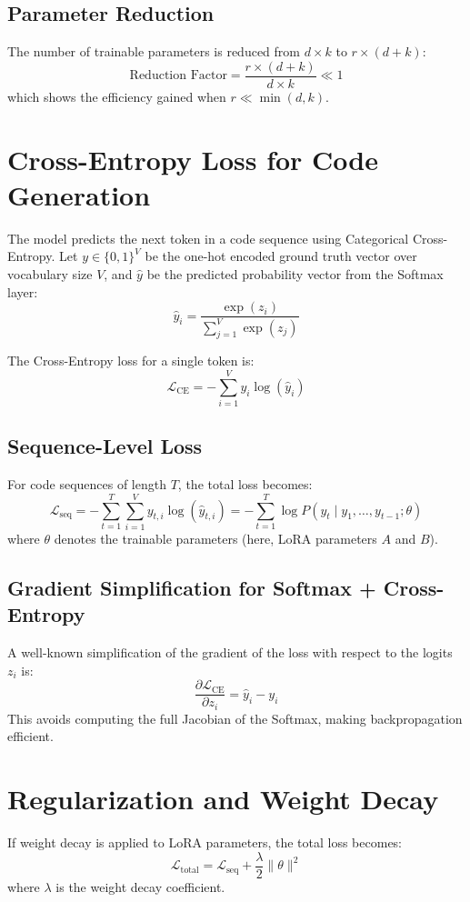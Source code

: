 \subsection{Parameter Reduction}
The number of trainable parameters is reduced from $d \times k$ to $r \times (d + k)$:
\[
\text{Reduction Factor} = \frac{r \times (d+k)}{d \times k} \ll 1
\]
which shows the efficiency gained when $r \ll \min(d,k)$.

\section{Cross-Entropy Loss for Code Generation}
The model predicts the next token in a code sequence using Categorical Cross-Entropy. Let $y \in \{0,1\}^V$ be the one-hot encoded ground truth vector over vocabulary size $V$, and $\hat{y}$ be the predicted probability vector from the Softmax layer:
\[
\hat{y}_i = \frac{\exp(z_i)}{\sum_{j=1}^{V} \exp(z_j)}
\]

The Cross-Entropy loss for a single token is:
\[
\mathcal{L}_\text{CE} = - \sum_{i=1}^{V} y_i \log(\hat{y}_i)
\]

\subsection{Sequence-Level Loss}
For code sequences of length $T$, the total loss becomes:
\[
\mathcal{L}_\text{seq} = - \sum_{t=1}^{T} \sum_{i=1}^{V} y_{t,i} \log(\hat{y}_{t,i}) 
= - \sum_{t=1}^{T} \log P(y_t \mid y_1, \dots, y_{t-1}; \theta)
\]
where $\theta$ denotes the trainable parameters (here, LoRA parameters $A$ and $B$).

\subsection{Gradient Simplification for Softmax + Cross-Entropy}
A well-known simplification of the gradient of the loss with respect to the logits $z_i$ is:
\[
\frac{\partial \mathcal{L}_\text{CE}}{\partial z_i} = \hat{y}_i - y_i
\]
This avoids computing the full Jacobian of the Softmax, making backpropagation efficient.


\section{Regularization and Weight Decay}
If weight decay is applied to LoRA parameters, the total loss becomes:
\[
\mathcal{L}_\text{total} = \mathcal{L}_\text{seq} + \frac{\lambda}{2} \| \theta \|^2
\]
where $\lambda$ is the weight decay coefficient.

